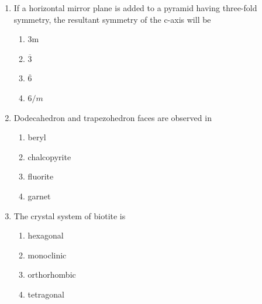 \documentclass[journal,12pt,onecolumn]{IEEEtran}
\theoremstyle{remark}
\begin{document}
\begin{enumerate}
    \begin{multicols}{4}
        \begin{enumerate}
            \item P
            \item Q
            \item R
            \item S
        \end{enumerate}
    \end{multicols}

    \item If a horizontal mirror plane is added to a pyramid having three-fold symmetry, the resultant symmetry of the c-axis will be

    \hfill{}
    
    \begin{multicols}{4}
        \begin{enumerate}
            \item 3m
            \item $\overline{3}$
            \item $\overline{6}$
            \item $6/m$
        \end{enumerate}
    \end{multicols}

\newpage

    \item Dodecahedron and trapezohedron faces are observed in

    \hfill{}
    
    \begin{multicols}{4}
        \begin{enumerate}
            \item beryl
            \item chalcopyrite
            \item fluorite
            \item garnet
        \end{enumerate}
    \end{multicols}

    \item The crystal system of biotite is

    \hfill{}
    
    \begin{multicols}{4}
        \begin{enumerate}
            \item hexagonal
            \item monoclinic
            \item orthorhombic
            \item tetragonal
        \end{enumerate}
    \end{multicols}


\end{enumerate}
\end{document}

